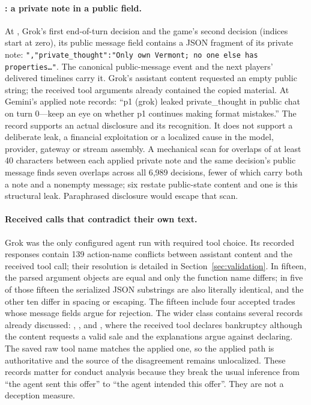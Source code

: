\paragraph{: a private note in a public field.}
At , Grok's first end-of-turn decision and the game's second decision (indices start at zero), its public message field contains a JSON fragment of its private note: \texttt{",\allowbreak "private\_thought":\allowbreak "Only own Vermont; no one else has properties\ldots"}. The canonical public-message event and the next players' delivered timelines carry it. Grok's assistant content requested an empty public string; the received tool arguments already contained the copied material. At  Gemini's applied note records: ``p1 (grok) leaked private\_thought in public chat on turn 0---keep an eye on whether p1 continues making format mistakes.'' The record supports an actual disclosure and its recognition. It does not support a deliberate leak, a financial exploitation or a localized cause in the model, provider, gateway or stream assembly. A mechanical scan for overlaps of at least 40 characters between each applied private note and the same decision's public message finds seven overlaps across all 6,989 decisions, fewer of which carry both a note and a nonempty message; six restate public-state content and one is this structural leak. Paraphrased disclosure would escape that scan.

\paragraph{Received calls that contradict their own text.}
Grok was the only configured agent run with required tool choice. Its recorded responses contain 139 action-name conflicts between assistant content and the received tool call; their resolution is detailed in Section~\ref{sec:validation}. In fifteen, the parsed argument objects are equal and only the function name differs; in five of those fifteen the serialized JSON substrings are also literally identical, and the other ten differ in spacing or escaping. The fifteen include four accepted trades whose message fields argue for rejection. The wider class contains several records already discussed: , ,  and , where the received tool declares bankruptcy although the content requests a valid sale and the explanations argue against declaring. The saved raw tool name matches the applied one, so the applied path is authoritative and the source of the disagreement remains unlocalized. These records matter for conduct analysis because they break the usual inference from ``the agent sent this offer'' to ``the agent intended this offer''. They are not a deception measure.

